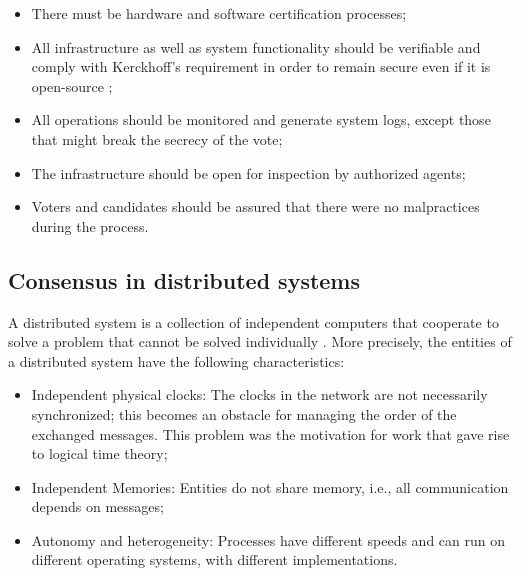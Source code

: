 \documentclass[english]{textolivre}
\begin{document}
\begin{itemize}

\item There must be hardware and software certification processes;


\item All infrastructure as well as system functionality should be verifiable and comply with Kerckhoff's requirement in order to remain secure even if it is open-source \cite{katz2020introduction, Kerckhoffs};

\item All operations should be monitored and generate system logs, except those that might break the secrecy of the vote;


\item The infrastructure should be open for inspection by authorized agents;

\item Voters and candidates should be assured that there were no malpractices during the process.

\end{itemize}

\subsection{Consensus in distributed systems \label{sec-consensus}}

A distributed system is a collection of independent computers that cooperate to solve a problem that cannot be solved individually \cite{Kshemkalyani}. More precisely, the entities of a distributed system have the following characteristics:

\begin{itemize}

\item Independent physical clocks: The clocks in the network are not necessarily synchronized; this becomes an obstacle for managing the order of the exchanged messages. This problem was the motivation for \textcite{Lamport} work that gave rise to logical time theory;

\item Independent Memories: Entities do not share memory, i.e., all communication depends on messages;

\item Autonomy and heterogeneity: Processes have different speeds and can run on different operating systems, with different implementations.

\end{itemize}
\end{document}
